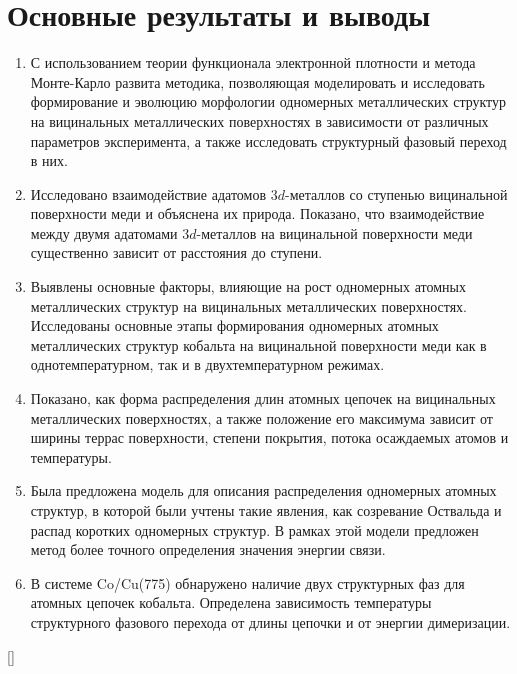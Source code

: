 \documentclass[10pt]{book}
\begin{document}
\chapter{Основные результаты и выводы}
\begin{enumerate}
	\item С использованием теории функционала электронной плотности и метода Монте-Карло развита методика, позволяющая моделировать и исследовать формирование и эволюцию морфологии одномерных  металлических структур на вицинальных металлических поверхностях в зависимости от различных параметров эксперимента, а также исследовать структурный фазовый переход в них.

	\item Исследовано взаимодействие адатомов $3d$-металлов со ступенью вицинальной поверхности меди и объяснена их природа. Показано, что взаимодействие между двумя адатомами $3d$-металлов на вицинальной поверхности меди существенно зависит от расстояния до ступени.

	\item Выявлены основные факторы, влияющие на рост одномерных атомных металлических структур на вицинальных металлических поверхностях. Исследованы основные этапы формирования одномерных атомных металлических структур кобальта на вицинальной поверхности меди как в однотемпературном, так и в двухтемпературном режимах.

	\item Показано, как форма распределения длин атомных цепочек на вицинальных металлических поверхностях, а также положение его максимума зависит от ширины террас поверхности, степени покрытия, потока осаждаемых атомов и температуры.

	\item Была предложена модель для описания распределения одномерных атомных структур, в которой были учтены такие явления, как созревание Оствальда и распад коротких одномерных структур. В рамках этой модели предложен метод более точного определения значения энергии связи.

	\item В системе Co/Cu(775) обнаружено наличие двух структурных фаз для  атомных цепочек кобальта. Определена зависимость температуры структурного фазового перехода от длины цепочки и от энергии димеризации.
\end{enumerate}


[]
\end{document}

